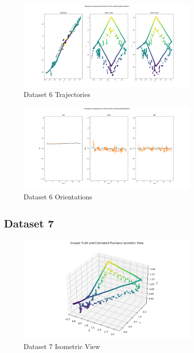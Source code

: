 \documentclass{article}
\begin{document}
\begin{figure}[H]
    \centering
    \includegraphics[width=0.8\textwidth]{./imgs/task1_2/studentdata6_trajectory_merged.png}
    \caption{Dataset 6 Trajectories}
\end{figure}

\begin{figure}[H]
    \centering
    \includegraphics[width=0.8\textwidth]{./imgs/task1_2/studentdata6_orientation_merged.png}
    \caption{Dataset 6 Orientations}
\end{figure}

\subsection*{Dataset 7}

\begin{figure}[H]
    \centering
    \includegraphics[width=0.8\textwidth]{./imgs/task1_2/studentdata7_isometric.png}
    \caption{Dataset 7 Isometric View}
\end{figure}
\end{document}
